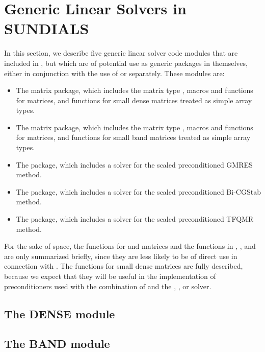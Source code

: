 \chapter{Generic Linear Solvers in SUNDIALS}\label{s:gen_linsolv}
In this section, we describe five generic linear solver code modules that 
are included in {\ida}, but which are of potential use as generic packages in
themselves, either in conjunction with the use of {\ida} or separately.
These modules are:
\begin{itemize}
\item The {\dense} matrix package, which includes the matrix type ,
      macros and functions for  matrices, and functions
      for small dense matrices treated as simple array types.
\item The {\band} matrix package, which includes the matrix type ,
      macros and functions for  matrices, and functions
      for small band matrices treated as simple array types.
\item The {\spgmr} package, which includes a solver for the scaled
      preconditioned GMRES method.
\item The {\spbcg} package, which includes a solver for the scaled
      preconditioned Bi-CGStab method.
\item The {\sptfqmr} package, which includes a solver for the scaled
      preconditioned TFQMR method.
\end{itemize}

For the sake of space, the functions for  and
 matrices and the functions in {\spgmr}, {\spbcg}, and {\sptfqmr}
are only summarized briefly, since they are less likely to be of direct use
in connection with {\ida}.  The functions for small dense matrices are fully
described, because we expect that they will be useful in the
implementation of preconditioners used with the combination of {\ida}
and the {\idaspgmr}, {\idaspbcg}, or {\idasptfqmr} solver.

\section{The DENSE module}\label{ss:dense}


\section{The BAND module}\label{ss:band}


